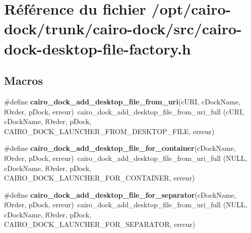 \section{Référence du fichier /opt/cairo-dock/trunk/cairo-dock/src/cairo-dock-desktop-file-factory.h}
\label{cairo-dock-desktop-file-factory_8h}
\subsection*{Macros}
\begin{CompactItemize}
\item 
\#define {\bf cairo\_\-dock\_\-add\_\-desktop\_\-file\_\-from\_\-uri}(cURI, cDockName, fOrder, pDock, erreur)~cairo\_\-dock\_\-add\_\-desktop\_\-file\_\-from\_\-uri\_\-full (cURI, cDockName, fOrder, pDock, CAIRO\_\-DOCK\_\-LAUNCHER\_\-FROM\_\-DESKTOP\_\-FILE, erreur)
\item 
\#define {\bf cairo\_\-dock\_\-add\_\-desktop\_\-file\_\-for\_\-container}(cDockName, fOrder, pDock, erreur)~cairo\_\-dock\_\-add\_\-desktop\_\-file\_\-from\_\-uri\_\-full (NULL, cDockName, fOrder, pDock, CAIRO\_\-DOCK\_\-LAUNCHER\_\-FOR\_\-CONTAINER, erreur)
\item 
\#define {\bf cairo\_\-dock\_\-add\_\-desktop\_\-file\_\-for\_\-separator}(cDockName, fOrder, pDock, erreur)~cairo\_\-dock\_\-add\_\-desktop\_\-file\_\-from\_\-uri\_\-full (NULL, cDockName, fOrder, pDock, CAIRO\_\-DOCK\_\-LAUNCHER\_\-FOR\_\-SEPARATOR, erreur)
\end{CompactItemize}
